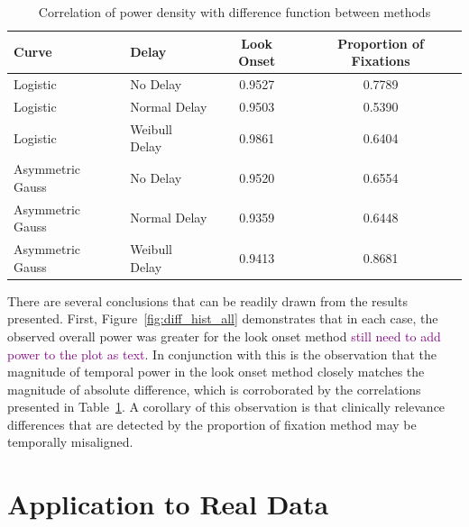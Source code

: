 \documentclass{article}
\providecommand{\cmt}[1]{\textcolor{purple}{#1}}
\begin{document}
\begin{table}[H]
\centering
\begin{tabular}{llcc}
  \hline
Curve & Delay & Look Onset & Proportion of Fixations \\ 
  \hline
Logistic & No Delay & 0.9527 & 0.7789 \\ 
  Logistic & Normal Delay & 0.9503 & 0.5390 \\ 
  Logistic & Weibull Delay & 0.9861 & 0.6404 \\ 
  Asymmetric Gauss & No Delay & 0.9520 & 0.6554 \\ 
  Asymmetric Gauss & Normal Delay & 0.9359 & 0.6448 \\ 
  Asymmetric Gauss & Weibull Delay & 0.9413 & 0.8681 \\ 
   \hline
\end{tabular}
\caption{Correlation of power density with difference function between methods}
\label{tab:correlation_power}
\end{table}

There are several conclusions that can be readily drawn from the results presented. First, Figure~\ref{fig:diff_hist_all} demonstrates that in each case, the observed overall power was greater for the look onset method \cmt{still need to add power to the plot as text}. In conjunction with this is the observation that the magnitude of temporal power in the look onset method closely matches the magnitude of absolute difference, which is corroborated by the correlations presented in Table~\ref{tab:correlation_power}. A corollary of this observation is that clinically relevance differences that are detected by the proportion of fixation method may be temporally misaligned. 




\section{Application to Real Data}
\end{document}
